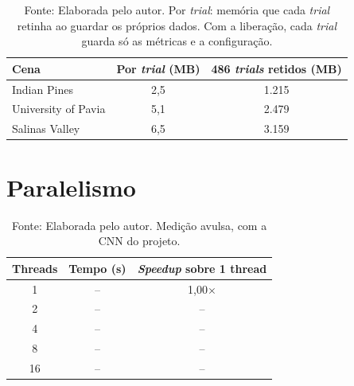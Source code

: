 \begin{table}[H]
    \centering
    \caption{Memória retida por \textit{trial} da busca e projeção para uma campanha do tamanho da do experimento 04 (486 \textit{trials}) sem liberação}
    \begin{tabular}{|l|c|c|}
        \hline
        \rowcolor[HTML]{C0C0C0}
        \textbf{Cena} & \textbf{Por \textit{trial} (MB)} & \textbf{486 \textit{trials} retidos (MB)} \\
        \hline
        Indian Pines & 2,5 & 1.215 \\ \hline
        University of Pavia & 5,1 & 2.479 \\ \hline
        Salinas Valley & 6,5 & 3.159 \\ \hline
    \end{tabular}
    \captionsetup{justification=raggedright}
    \caption*{Fonte: Elaborada pelo autor. Por \textit{trial}: memória que cada \textit{trial} retinha ao guardar os próprios dados. Com a liberação, cada \textit{trial} guarda só as métricas e a configuração. }
    \label{tab:memoria}
\end{table}

\section{Paralelismo}

\begin{table}[H]
    \centering
    \caption{Treino com as threads internas do PyTorch (Indian Pines, 25 épocas, CPU)}
    \begin{tabular}{|c|c|c|}
        \hline
        \rowcolor[HTML]{C0C0C0}
        \textbf{Threads} & \textbf{Tempo (s)} & \textbf{\textit{Speedup} sobre 1 thread} \\
        \hline
        1 & -- & 1,00$\times$ \\ \hline
        2 & -- & -- \\ \hline
        4 & -- & -- \\ \hline
        8 & -- & -- \\ \hline
        16 & -- & -- \\ \hline
    \end{tabular}
    \captionsetup{justification=raggedright}
    \caption*{Fonte: Elaborada pelo autor. Medição avulsa, com a CNN do projeto. }
    \label{tab:threadsTorch}
\end{table}

